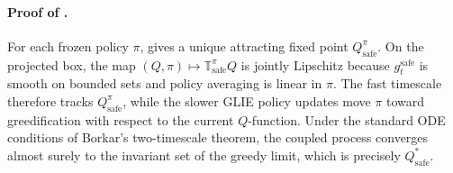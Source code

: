\documentclass{article}
\theoremstyle{remark}
\newcommand{\safe}{\mathrm{safe}}
\begin{document}
\paragraph{Proof of .}
For each frozen policy $\pi$,  gives a unique attracting fixed point $Q_\safe^\pi$.
On the projected box, the map $(Q,\pi)\mapsto \mathbb T_\safe^\pi Q$ is jointly Lipschitz because $g_t^{\safe}$ is smooth on bounded sets and policy averaging is linear in $\pi$.
The fast timescale therefore tracks $Q_\safe^\pi$, while the slower GLIE policy updates move $\pi$ toward greedification with respect to the current $Q$-function.
Under the standard ODE conditions of Borkar's two-timescale theorem, the coupled process converges almost surely to the invariant set of the greedy limit, which is precisely $Q_\safe^*$.




\end{document}
